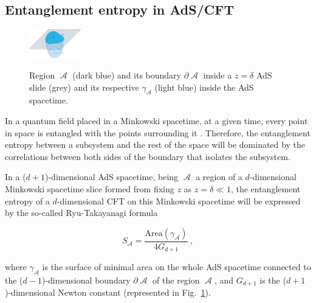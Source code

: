 \documentclass[twocolumn]{revtex4}
\providecommand{\eq}[2]{
    \begin{equation}
        #2
    \label{eq:#1}
    \end{equation}
}
\DeclareMathOperator{\calA}{\mathcal{A}}
\begin{document}
\subsection{Entanglement entropy in AdS/CFT} \label{ss:EE_AdS/CFT}

\begin{figure}
    \centering
    \includegraphics[width=0.2\textwidth]{../Imatges/Extern/EE_AdS-CFT.png}
\label{fig:EE_AdS-CFT}
\caption{Region $\calA$ (dark blue) and its boundary $\partial \calA$ inside a $z=\delta$ AdS slide (grey) and its respective $\gamma_{\calA}$ (light blue) inside the AdS spacetime.}
\end{figure}

In a quantum field placed in a Minkowski spacetime, at a given time, every point in space is entangled with the points surrounding it \cite{nishioka_entanglement_2018}. Therefore, the entanglement entropy between a subsystem and the rest of the space will be dominated by the correlations between both sides of the boundary that isolates the subsystem.



In a ($d+1$)-dimensional AdS spacetime, being $\calA$ a region of a $d$-dimensional Minkowski spacetime slice formed from fixing $z$ as $z=\delta \ll 1$, the entanglement entropy of a $d$-dimensional CFT on this Minkowski spacetime will be expressed by the so-called Ryu-Takayanagi formula
\eq{EE_RT}{
    S_{\calA} = \frac{ \text{Area}(\gamma_{\calA}) }{ 4 G_{d+1} } \ ,
}
\cite{ryu_holographic_2008} where $\gamma_{\calA}$ is the surface of minimal area on the whole AdS spacetime connected to the ($d-1$)-dimensional boundary $\partial \calA$ of the region $\calA$, and $G_{d+1}$ is the ($d+1$)-dimensional Newton constant (represented in Fig.~\ref{fig:EE_AdS-CFT}).
\end{document}
